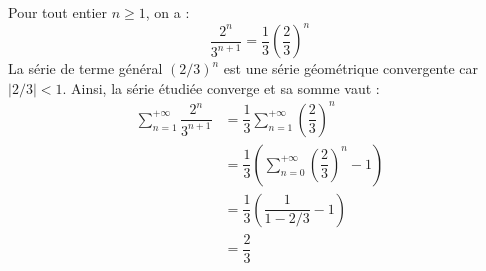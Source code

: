\documentclass[a4paper,twoside,french,11pt]{VcCours}
\begin{document}
\begin{Exercice}{}\end{Exercice}Pour tout entier $n \geq 1$, on a :
$$ \dfrac{2^n}{3^{n+1}} = \dfrac{1}{3} \left( \dfrac{2}{3} \right)^n $$
La série de terme général $(2/3)^n$ est une série géométrique convergente car $\vert 2/3 \vert <1$. Ainsi, la série étudiée converge et sa somme vaut :
\begin{align*}
\sum_{n=1}^{+ \infty}  \dfrac{2^n}{3^{n+1}} & = \dfrac{1}{3} \sum_{n=1}^{+ \infty}  \left( \dfrac{2}{3} \right)^n  \\
& = \dfrac{1}{3} \left( \sum_{n=0}^{+ \infty}  \left( \dfrac{2}{3} \right)^n - 1 \right) \\
& = \dfrac{1}{3} \left( \dfrac{1}{1-2/3} - 1\right) \\
& = \dfrac{2}{3} 
\end{align*}

\begin{Exercice}{}\end{Exercice}
\end{document}
